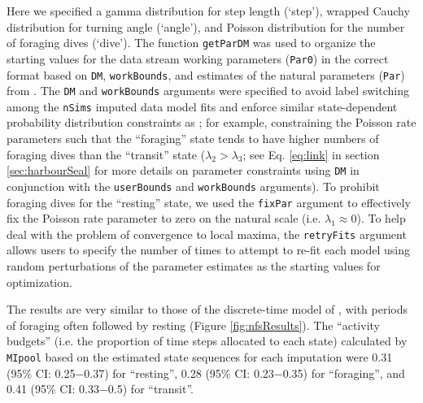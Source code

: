 \documentclass[12pt]{article}\usepackage[]{graphicx}\usepackage[]{color}
\begin{document}
Here we specified a gamma distribution for step length (`step'), wrapped Cauchy distribution for turning angle (`angle'), and Poisson distribution for the number of foraging dives (`dive'). The function \verb|getParDM| was used to organize the starting values for the data stream working parameters (\verb|Par0|) in the correct format based on \verb|DM|, \verb|workBounds|, and estimates of the natural parameters (\verb|Par|) from \cite{McClintockEtAl2014b}. The \verb|DM| and \verb|workBounds| arguments were specified to avoid label switching among the \verb|nSims| imputed data model fits and enforce similar state-dependent probability distribution constraints as \cite{McClintockEtAl2014b}; for example, constraining the Poisson rate parameters such that the ``foraging'' state tends to have higher numbers of foraging dives than the ``transit'' state ($\lambda_2 > \lambda_3$; see Eq. \ref{eq:link} in section \ref{sec:harbourSeal} for more details on parameter constraints using \verb|DM| in conjunction with the \verb|userBounds| and \verb|workBounds| arguments). To prohibit foraging dives for the ``resting'' state, we used the \verb|fixPar| argument to effectively fix the Poisson rate parameter to zero on the natural scale (i.e. $\lambda_1 \approx 0$).  To help deal with the problem of convergence to local maxima, the \verb|retryFits| argument allows users to specify the number of times to attempt to re-fit each model using random perturbations of the parameter estimates as the starting values for optimization.

The results are very similar to those of the discrete-time model of \cite{McClintockEtAl2014b}, with periods of foraging often followed by resting (Figure \ref{fig:nfsResults}).  The ``activity budgets'' (i.e. the proportion of time steps allocated to each state) calculated by \verb|MIpool| based on the estimated state sequences for each imputation were 0.31 (95\% CI: 0.25$-$0.37) for ``resting'', 0.28 (95\% CI: 0.23$-$0.35) for ``foraging'', and 0.41 (95\% CI: 0.33$-$0.5) for ``transit''.
\end{document}
